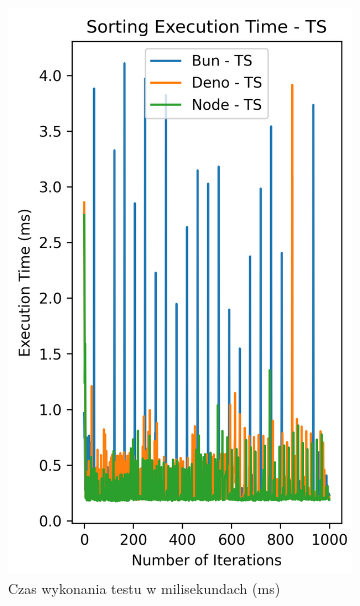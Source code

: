 \begin{figure}[H]
  \centering
  \begin{subfigure}[b]{0.4\textwidth}
    \centering
    \includegraphics[width=\textwidth]{Figures/sorting/sorting_quick_1000_1000_ts_time.png}
    \caption{Czas wykonania testu w milisekundach (ms)}
    \label{fig:quick_sorting_e2_ts_time}
  \end{subfigure}
  \begin{subfigure}[b]{0.4\textwidth}
    \centering

\end{subfigure}
\end{figure}
